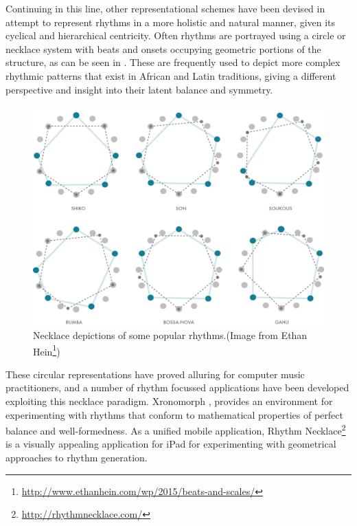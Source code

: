 Continuing in this line, other representational schemes have been devised in attempt to represent rhythms in a more holistic and natural manner, given its cyclical and hierarchical centricity. Often rhythms are portrayed using a circle or necklace system with beats and onsets occupying geometric portions of the structure, as can be seen in . These are frequently used to depict more complex rhythmic patterns that exist in African and Latin traditions, giving a different perspective and insight into their latent balance and symmetry.

\begin{figure}
	\begin{center}
		\includegraphics[width=\figSizeHundred]{ch03_symbolic/figures/necklace.jpg}
	\end{center}
	\caption[Necklace Depictions of Some Popular Rhythms.]{Necklace depictions of some popular rhythms.(Image from Ethan Hein\footnote{\url{http://www.ethanhein.com/wp/2015/beats-and-scales/}})}
	\label{fig:necklace}
\end{figure}

These circular representations have proved alluring for computer music practitioners, and a number of rhythm focussed applications have been developed exploiting this necklace paradigm. Xronomorph \citep{Milne2015a, Milne2016}, provides an environment for experimenting with rhythms that conform to mathematical properties of perfect balance and well-formedness. As a unified mobile application, Rhythm Necklace\footnote{\url{http://rhythmnecklace.com/}} is a visually appealing application for iPad for experimenting with geometrical approaches to rhythm generation.

